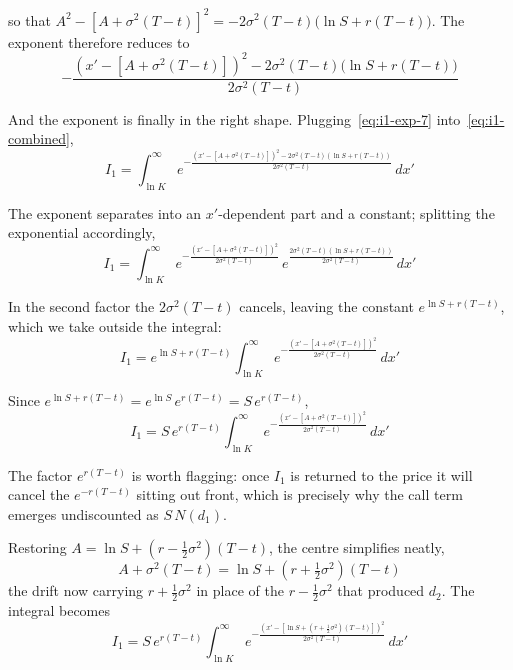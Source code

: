 \documentclass[a4paper,12pt]{article}
\numberwithin{equation}{section}
\begin{document}
so that $A^2 - \left[A + \sigma^2(T-t)\right]^2 = -2\sigma^2(T-t)\big(\ln S + r(T-t)\big)$.
The exponent therefore reduces to
\begin{equation}\label{eq:i1-exp-7}
  -\frac{\left(x' - \left[A + \sigma^2(T-t)\right]\right)^2 - 2\sigma^2(T-t)\big(\ln S + r(T-t)\big)}{2\sigma^2(T-t)} 
\end{equation}

And the exponent is finally in the right shape. Plugging~\eqref{eq:i1-exp-7}
into~\eqref{eq:i1-combined},
\begin{equation}\label{eq:i1-after-sub}
    I_1 = \int_{\ln K}^{\infty}
    e^{-\frac{\left(x' - \left[A + \sigma^2(T-t)\right]\right)^2 - 2\sigma^2(T-t)\left(\ln S + r(T-t)\right)}{2\sigma^2(T-t)}}
    \,dx' 
\end{equation}

The exponent separates into an $x'$-dependent part and a constant; splitting the
exponential accordingly,
\begin{equation}\label{eq:i1-after-sub-2}
    I_1 = \int_{\ln K}^{\infty}
    e^{-\frac{\left(x' - \left[A + \sigma^2(T-t)\right]\right)^2}{2\sigma^2(T-t)}}\,
    e^{\frac{2\sigma^2(T-t)\left(\ln S + r(T-t)\right)}{2\sigma^2(T-t)}}
    \,dx' 
\end{equation}

In the second factor the $2\sigma^2(T-t)$ cancels, leaving the constant
$e^{\ln S + r(T-t)}$, which we take outside the integral:
\begin{equation}\label{eq:i1-after-sub-3}
    I_1 = e^{\ln S + r(T-t)}\int_{\ln K}^{\infty}
    e^{-\frac{\left(x' - \left[A + \sigma^2(T-t)\right]\right)^2}{2\sigma^2(T-t)}}
    \,dx' 
\end{equation}

Since $e^{\ln S + r(T-t)} = e^{\ln S}\,e^{r(T-t)} = S\,e^{r(T-t)}$,
\begin{equation}\label{eq:i1-after-sub-4}
    I_1 = S\,e^{r(T-t)}\int_{\ln K}^{\infty}
    e^{-\frac{\left(x' - \left[A + \sigma^2(T-t)\right]\right)^2}{2\sigma^2(T-t)}}
    \,dx' 
\end{equation}

The factor $e^{r(T-t)}$ is worth flagging: once $I_1$ is returned to the price it
will cancel the $e^{-r(T-t)}$ sitting out front, which is precisely why the call
term emerges undiscounted as $S\,N(d_1)$.

Restoring $A = \ln S + \left(r - \tfrac{1}{2}\sigma^2\right)(T-t)$, the centre
simplifies neatly,
\[
  A + \sigma^2(T-t) = \ln S + \left(r + \tfrac{1}{2}\sigma^2\right)(T-t)
\]
the drift now carrying $r + \tfrac{1}{2}\sigma^2$ in place of the
$r - \tfrac{1}{2}\sigma^2$ that produced $d_2$. The integral becomes
\begin{equation}\label{eq:i1-after-sub-5}
    I_1 = S\,e^{r(T-t)}\int_{\ln K}^{\infty}
    e^{-\frac{\left(x' - \left[\ln S + \left(r + \frac{1}{2}\sigma^2\right)(T-t)\right]\right)^2}{2\sigma^2(T-t)}}
    \,dx' 
\end{equation}
\end{document}
